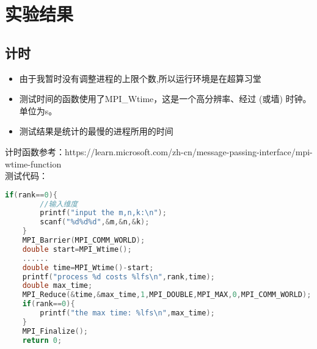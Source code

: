 \documentclass{SYSUReport}
\begin{document}


\section{实验结果}
\subsection{计时}
\begin{itemize}
    \item 由于我暂时没有调整进程的上限个数,所以运行环境是在超算习堂
    \item 测试时间的函数使用了MPI\_Wtime，这是一个高分辨率、经过 (或墙) 时钟。
    单位为s。
    \item 测试结果是统计的最慢的进程所用的时间
\end{itemize}
计时函数参考：https://learn.microsoft.com/zh-cn/message-passing-interface/mpi-wtime-function\\
测试代码：
\begin{lstlisting}[language=c++]
    if(rank==0){
        //输入维度
        printf("input the m,n,k:\n");
        scanf("%d%d%d",&m,&n,&k);
    }
    MPI_Barrier(MPI_COMM_WORLD);
    double start=MPI_Wtime();
    ......
    double time=MPI_Wtime()-start;
    printf("process %d costs %lfs\n",rank,time);
    double max_time;
    MPI_Reduce(&time,&max_time,1,MPI_DOUBLE,MPI_MAX,0,MPI_COMM_WORLD);
    if(rank==0){
        printf("the max time: %lfs\n",max_time);
    }
    MPI_Finalize();
    return 0;
\end{lstlisting}
\end{document}
